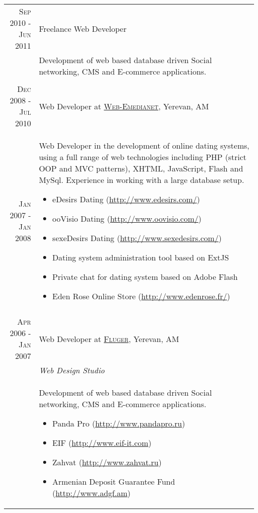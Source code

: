 \documentclass[a4paper,10pt]{article}
\begin{document}

\begin{tabular}{r|p{11cm}}

\textsc{Sep 2010 - Jun 2011}
  & Freelance Web Developer \\
  & \footnotesize{ Development of web based database driven Social networking,
    CMS and E-commerce applications.
} \\

  \multicolumn{2}{c}{} \\

  \textsc{Dec 2008 - Jul 2010}
    & Web Developer at 
      \textsc{\href{http://web-emedianet.com/}{Web-Emedianet}}, Yerevan, AM \\
  \textsc{Jan 2007 - Jan 2008}
    & \footnotesize{ Web Developer in the development of online dating
      systems, using a full range of web technologies including PHP (strict OOP
      and MVC patterns), XHTML, JavaScript, Flash and MySql. Experience in
      working with a large database setup.
  \begin{itemize}
    \item eDesirs Dating (\href{http://www.edesirs.com/}
                {http://www.edesirs.com/})
    \item ooVisio Dating (\href{http://www.oovisio.com}
                  {http://www.oovisio.com/})
    \item sexeDesirs Dating (\href{http://www.sexedesirs.com/}
                    {http://www.sexedesirs.com/})
    \item Dating system administration tool based on ExtJS
    \item Private chat for dating system based on Adobe Flash 
    \item Eden Rose Online Store 
          (\href{http://www.edenrose.fr}{http://www.edenrose.fr/})
  \end{itemize} 
} \\


\multicolumn{2}{c}{} \\


\textsc{Apr 2006 - Jan 2007} 
  & Web Developer at \textsc{\href{http://www.fluger.com}{Fluger}},
    Yerevan, AM \\ 
  & \emph{Web Design Studio} \\ 
  & \footnotesize{ Development of web based database driven Social networking,
    CMS and E-commerce applications.
    \begin{itemize}
      \item Panda Pro (\href{http://www.pandapro.ru}{http://www.pandapro.ru})
      \item EIF (\href{http://www.eif-it.com}{http://www.eif-it.com})
      \item Zahvat (\href{http://www.zahvat.ru}{http://www.zahvat.ru})
      \item Armenian Deposit Guarantee Fund
            (\href{http://www.adgf.am}{http://www.adgf.am})
    \end{itemize} 
}\\



\end{tabular}
\end{document}
